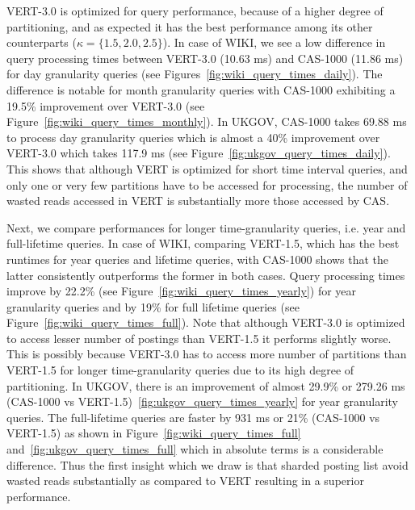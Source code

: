 VERT-3.0 is optimized for query performance, because of a higher
degree of partitioning, and as expected it has the best performance among its other counterparts ($\kappa = \{1.5, 2.0, 2.5\}$). In case of WIKI, we see a low difference in query
processing times between VERT-3.0 (10.63 ms) and CAS-1000 (11.86 ms) for day granularity queries (see Figures~\ref{fig:wiki_query_times_daily}). The difference is notable for month granularity queries with CAS-1000 exhibiting a 19.5\% improvement over VERT-3.0
 (see Figure~\ref{fig:wiki_query_times_monthly}). In UKGOV, CAS-1000 takes
69.88 ms to process day granularity queries which is almost a 40\% improvement over VERT-3.0 which takes 117.9 ms (see Figure~\ref{fig:ukgov_query_times_daily}). This shows that although VERT is optimized for short time interval queries, and only one or very few partitions have to be accessed for processing, the number of wasted reads accessed in VERT is substantially more those accessed by CAS.

Next, we compare performances for longer time-granularity queries, i.e. year and full-lifetime queries. In
case of WIKI, comparing VERT-1.5, which has the best runtimes for year
queries and lifetime queries, with CAS-1000 shows that the latter
consistently outperforms the former in both cases. Query processing times improve by
22.2\% (see Figure~\ref{fig:wiki_query_times_yearly}) for year granularity queries and
by 19\% for full lifetime queries
(see Figure~\ref{fig:wiki_query_times_full}). Note that although VERT-3.0 is optimized to access lesser number of postings than VERT-1.5 it performs slightly worse. This is possibly because VERT-3.0 has to access more number of partitions than VERT-1.5 for longer time-granularity queries due to its high degree of partitioning. In UKGOV, there is an
improvement of almost 29.9\% or 279.26 ms (CAS-1000 vs
VERT-1.5)~\ref{fig:ukgov_query_times_yearly} for year granularity queries. The full-lifetime queries are faster by 931 ms or 21\% (CAS-1000 vs VERT-1.5) as shown
in Figure~\ref{fig:wiki_query_times_full}
and~\ref{fig:ukgov_query_times_full} which in absolute terms is a considerable difference. Thus the first insight which we draw is that sharded posting list avoid wasted reads substantially as compared to VERT resulting in a superior performance.



